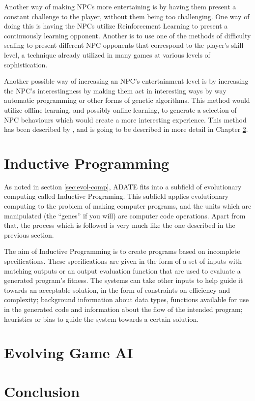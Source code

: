 \documentclass[]{report}
\begin{document}
Another way of making NPCs more entertaining is by having them present a
constant challenge to the player, without them being too challenging. One way of
doing this is having the NPCs utilize Reinforcement Learning
\citep{merrick2006motivated,sutton1998reinforcement} to present a continuously
learning opponent. Another is to use one of the methods of difficulty scaling to
present different NPC opponents that correspond to the player's skill level, a
technique already utilized in many games at various levels of sophistication.

Another possible way of increasing an NPC's entertainment level is by increasing
the NPC's interestingness by making them act in interesting ways by way
automatic programming or other forms of genetic algorithms. This method would
utilize offline learning, and possibly online learning, to generate a selection
of NPC behaviours which would create a more interesting experience. This method
has been described by \citet{yannakakis2005ai}, and is going to be described in
more detail in Chapter \ref{cha:game-ai-via}.

\chapter{Inductive Programming}
\label{cha:induct-progr}

As noted in section \ref{sec:evol-comp}, ADATE \citep{olsson1994inductive,vattekar2006adate} fits
into a subfield of evolutionary computing called Inductive Programing. This
subfield applies evolutionary computing to the problem of making computer
programs, and the units which are manipulated (the ``genes'' if you will) are
computer code operations. Apart from that, the process which is followed is very
much like the one described in the previous section.

The aim of Inductive Programming is to create programs based on incomplete
specifications. These specifications are given in the form of a set of inputs
with matching outputs or an output evaluation function that are used to evaluate
a generated program's fitness. The systems can take other inputs to help guide
it towards an acceptable solution, in the form of constraints on efficiency and
complexity; background information about data types, functions available for use
in the generated code and information about the flow of the intended program;
heuristics or bias to guide the system towards a certain
solution. \citep{aaip2010intro}



\chapter{Evolving Game AI}
\label{cha:game-ai-via}

\chapter{Conclusion}
\label{cha:conclusion}



\end{document}
